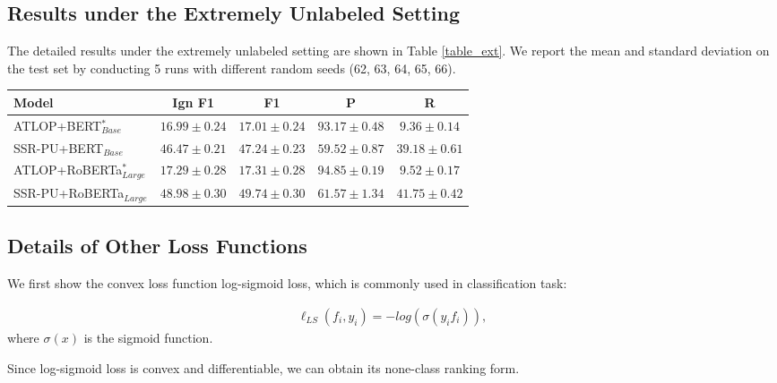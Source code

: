 \documentclass[11pt]{article}
\begin{document}
\subsection{Results under the Extremely Unlabeled Setting}
\label{c3}

The detailed results under the extremely unlabeled setting are shown in Table \ref{table_ext}. We report the mean and standard deviation on the test set by conducting 5 runs with different random seeds (62, 63, 64, 65, 66).

\begin{table*}
\centering
\begin{tabular}{lcccc}
\hline \textbf{Model} & \textbf{Ign F1} & \textbf{F1} & \textbf{P} & \textbf{R} \\
\hline ATLOP+BERT$_{Base}^{\ast}$ & $16.99 \pm 0.24$ & $17.01 \pm 0.24$ & $\mathbf{93.17} \pm \mathbf{0.48}$ & $9.36 \pm 0.14$ \\
SSR-PU+BERT$_{Base}$ & $\mathbf{46.47} \pm \mathbf{0.21}$ & $\mathbf{47.24} \pm \mathbf{0.23}$ & $59.52 \pm 0.87$ & $\mathbf{39.18} \pm \mathbf{0.61}$ \\
\hline ATLOP+RoBERTa$_{Large}^{\ast}$ & $17.29 \pm 0.28$ & $17.31 \pm 0.28$ & $\mathbf{94.85} \pm \mathbf{0.19}$ & $9.52 \pm 0.17$ \\
SSR-PU+RoBERTa$_{Large}$ & $\mathbf{48.98} \pm \mathbf{0.30}$ & $\mathbf{49.74} \pm \mathbf{0.30}$ & $61.57 \pm 1.34$ & $\mathbf{41.75} \pm \mathbf{0.42}$ \\
\hline
\end{tabular}
\caption{\label{table_ext}
Results on Re-DocRED revised test set under the extremely unlabeled setting. Results with $\ast$ are based on our implementation.
}
\end{table*}

\subsection{Details of Other Loss Functions}
\label{appendix5}
We first show the convex loss function log-sigmoid loss, which is commonly used in classification task:

\begin{equation}
\begin{aligned}\label{eq20}
\ell_{LS}(f_{i}, y_{i})=-log(\sigma(y_{i}f_{i})),
\end{aligned}
\end{equation}
where $\sigma(x)$ is the sigmoid function.

Since log-sigmoid loss is convex and differentiable, we can obtain its none-class ranking form.
\end{document}
